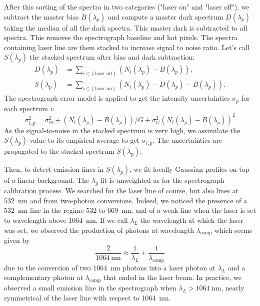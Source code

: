 After this sorting of the spectra in two categories ("laser on" and "laser off"), we subtract the master bias $B(\lambda_p)$ and compute a master dark spectrum $D(\lambda_p)$ taking the median of all the dark spectra. This master dark is subtracted to all spectra. This removes the spectrograph baseline and hot pixels. The spectra containing laser line are them stacked to increase signal to noise ratio. Let's call $S(\lambda_p)$ the stacked spectrum after bias and dark subtraction:
\begin{align}
D(\lambda_p) & = \sum_{i \in \left\lbrace \text{laser off}\right\rbrace}\left( N_i(\lambda_p) - B(\lambda_p)\right), \\
    S(\lambda_p) & = \sum_{i \in \left\lbrace \text{laser on}\right\rbrace}\left( N_i(\lambda_p) - D(\lambda_p) - B(\lambda_p)\right).
\end{align}
The spectrograph error model is applied to get the intensity uncertainties $\sigma_p$ for each spectrum $i$:
\begin{equation}\label{eq:spectro_error_model_data}
\sigma^2_{i,p} =\sigma_{ro}^2 +  (N_i(\lambda_p) - B(\lambda_p))/G + \sigma_G^2 (N_i(\lambda_p) - B(\lambda_p))^2
\end{equation}
As the signal-to-noise in the stacked spectrum is very high, we assimilate the $S(\lambda_p)$ value to its empirical average to get $\sigma_{i,p}$. The uncertainties are propagated to the stacked spectrum $S(\lambda_p)$.

Then, to detect emission lines in $S(\lambda_p)$, we fit locally Gaussian profiles on top of a linear background. The $\lambda_g$ fit is unweighted as for the spectrograph calibration process. We searched for the laser line of course, but also lines at \SI{532}{\nm} and from two-photon conversions. Indeed, we noticed the presence of a \SI{532}{\nm} line in the regime 532 to \SI{669}{\nm}, and of a weak line when the laser is set to wavelength above \SI{1064}{\nm}. If we call $\lambda_L$ the wavelength at which the laser was set, we observed the production of photons at wavelength $\lambda_{\text{comp}}$ which seems given by
\begin{equation}
 \frac{2}{\SI{1064}{\nm}} \approx \frac{1}{\lambda_L} + \frac{1}{\lambda_{\text{comp}}}
 \end{equation} 
due to the conversion of two \SI{1064}{\nm} photons into a laser photon at $\lambda_L$ and a complementary photon at $\lambda_{\text{comp}}$ that ended in the laser beam. In practice, we observed a small emission line in the spectrograph when $\lambda_L > \SI{1064}{\nm}$, nearly symmetrical of the laser line with respect to \SI{1064}{\nm}. 

